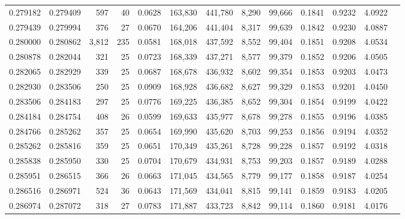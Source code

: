 \begin{tabular}{rrrrrrrrrrrrr}
0.279182 & 0.279409 &   597 &  40 &                                     0.0628 & 163,830 & 441,780 &   8,290 &  99,666 & 0.1841 & 0.9232 & 4.0922 \\
0.279439 & 0.279994 &   376 &  27 &                                     0.0670 & 164,206 & 441,404 &   8,317 &  99,639 & 0.1842 & 0.9230 & 4.0887 \\
0.280000 & 0.280862 & 3,812 & 235 &                                     0.0581 & 168,018 & 437,592 &   8,552 &  99,404 & 0.1851 & 0.9208 & 4.0534 \\
0.280878 & 0.282044 &   321 &  25 &                                     0.0723 & 168,339 & 437,271 &   8,577 &  99,379 & 0.1852 & 0.9206 & 4.0505 \\
0.282065 & 0.282929 &   339 &  25 &                                     0.0687 & 168,678 & 436,932 &   8,602 &  99,354 & 0.1853 & 0.9203 & 4.0473 \\
0.282930 & 0.283506 &   250 &  25 &                                     0.0909 & 168,928 & 436,682 &   8,627 &  99,329 & 0.1853 & 0.9201 & 4.0450 \\
0.283506 & 0.284183 &   297 &  25 &                                     0.0776 & 169,225 & 436,385 &   8,652 &  99,304 & 0.1854 & 0.9199 & 4.0422 \\
0.284184 & 0.284754 &   408 &  26 &                                     0.0599 & 169,633 & 435,977 &   8,678 &  99,278 & 0.1855 & 0.9196 & 4.0385 \\
0.284766 & 0.285262 &   357 &  25 &                                     0.0654 & 169,990 & 435,620 &   8,703 &  99,253 & 0.1856 & 0.9194 & 4.0352 \\
0.285262 & 0.285816 &   359 &  25 &                                     0.0651 & 170,349 & 435,261 &   8,728 &  99,228 & 0.1857 & 0.9192 & 4.0318 \\
0.285838 & 0.285950 &   330 &  25 &                                     0.0704 & 170,679 & 434,931 &   8,753 &  99,203 & 0.1857 & 0.9189 & 4.0288 \\
0.285951 & 0.286515 &   366 &  26 &                                     0.0663 & 171,045 & 434,565 &   8,779 &  99,177 & 0.1858 & 0.9187 & 4.0254 \\
0.286516 & 0.286971 &   524 &  36 &                                     0.0643 & 171,569 & 434,041 &   8,815 &  99,141 & 0.1859 & 0.9183 & 4.0205 \\
0.286974 & 0.287072 &   318 &  27 &                                     0.0783 & 171,887 & 433,723 &   8,842 &  99,114 & 0.1860 & 0.9181 & 4.0176 \\

\end{tabular}
